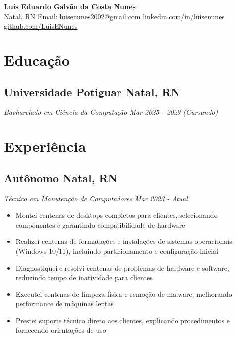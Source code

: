 \documentclass[a4paper,10pt]{article}
\begin{document}
\begin{center}
    {\LARGE \textbf{Luis Eduardo Galvão da Costa Nunes}} 
    \\ [0.1cm]
    Natal, RN
    {\textbullet}
    Email: \href{mailto:luisenunes2002@gmail.com}{luisenunes2002@gmail.com} 
    {\textbullet}
    \href{https://www.linkedin.com/in/luisenunes}{linkedin.com/in/luisenunes} 
    {\textbullet}
    \href{https://github.com/LuisENunes}{github.com/LuisENunes}
\end{center}


\section{Educação}
    \subsection*{\texorpdfstring{
            \textbf{Universidade Potiguar} \hfill Natal, RN
        }{
            Universidade Potiguar -- Natal, RN
        }}
    \textit{Bacharelado em Ciência da Computação \hfill Mar 2025 - 2029 (Cursando)}


\section{Experiência}
    \subsection*{\texorpdfstring{
            \textbf{Autônomo} \hfill Natal, RN
        }{
            Autônomo -- Natal, RN
        }}
    \textit{Técnico em Manutenção de Computadores \hfill Mar 2023 - Atual}
        \begin{itemize}
            \item Montei centenas de desktops completos para clientes, selecionando componentes e garantindo compatibilidade de hardware
            \item Realizei centenas de formatações e instalações de sistemas operacionais (Windows 10/11), incluindo particionamento e configuração inicial
            \item Diagnostiquei e resolvi centenas de problemas de hardware e software, reduzindo tempo de inatividade para clientes
            \item Executei centenas de limpeza física e remoção de malware, melhorando performance de máquinas lentas
            \item Prestei suporte técnico direto aos clientes, explicando procedimentos e fornecendo orientações de uso
        \end{itemize}
\end{document}
